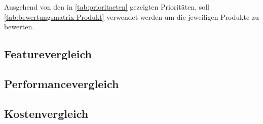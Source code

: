 

Ausgehend von den in \autoref{tab:prioritaeten} gezeigten Prioritäten, soll \autoref{tab:bewertungsmatrix-Produkt} verwendet werden um die jeweiligen Produkte zu bewerten.

\subsection{Featurevergleich}

\subsection{Performancevergleich}

\subsection{Kostenvergleich}
